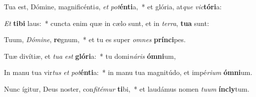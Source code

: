 \item Tua est, Dómine, magnificénti\textit{a}, \textit{et} \textit{pot}\textbf{én}\textbf{ti}a,~* et glória, at\textit{que} \textit{vic}\textbf{tó}\textbf{ri}a:
\item \textit{Et} \textbf{ti}\textbf{bi} laus:~* cuncta enim quæ in cælo sunt, et in \textit{ter}\textit{ra}, \textbf{tu}\textbf{a} sunt:
\item Tuum, \textit{Dó}\textit{mi}\textit{ne}, \textbf{re}gnum,~* et tu es super \textit{om}\textit{nes} \textbf{prín}\textbf{ci}pes.
\item Tuæ divítiæ, et \textit{tu}\textit{a} \textit{est} \textbf{gló}\textbf{ri}a:~* tu domi\textit{ná}\textit{ris} \textbf{óm}\textbf{ni}um,
\item In manu tua vir\textit{tus} \textit{et} \textit{pot}\textbf{én}\textbf{ti}a:~* in manu tua magnitúdo, et impé\textit{ri}\textit{um} \textbf{óm}\textbf{ni}um.
\item Nunc ígitur, Deus noster, con\textit{fi}\textit{té}\textit{mur} \textbf{ti}bi,~* et laudámus nomen \textit{tu}\textit{um} \textbf{ín}\textbf{cly}tum.
